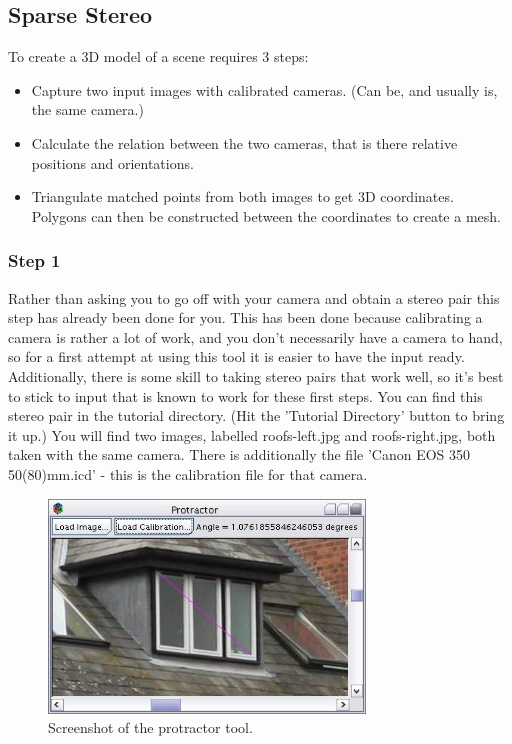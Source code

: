 \documentclass[10pt,a4paper,twoside]{article}
\begin{document}
\subsection {Sparse Stereo}
To create a 3D model of a scene requires 3 steps:
\begin{itemize}
\item Capture two input images with calibrated cameras. (Can be, and usually is, the same camera.)
\item Calculate the relation between the two cameras, that is there relative positions and orientations.
\item Triangulate matched points from both images to get 3D coordinates. Polygons can then be constructed between the coordinates to create a mesh.
\end{itemize}


\subsubsection {Step 1}

Rather than asking you to go off with your camera and obtain a stereo pair this step has already been done for you. This has been done because calibrating a camera is rather a lot of work, and you don't necessarily have a camera to hand, so for a first attempt at using this tool it is easier to have the input ready. Additionally, there is some skill to taking stereo pairs that work well, so it's best to stick to input that is known to work for these first steps. You can find this stereo pair in the tutorial directory. (Hit the 'Tutorial Directory' button to bring it up.) You will find two images, labelled roofs-left.jpg and roofs-right.jpg, both taken with the same camera. There is additionally the file 'Canon EOS 350 50(80)mm.icd' - this is the calibration file for that camera. 

\begin{figure}
 \centering
 \includegraphics[width=0.75\textwidth]{screenshots/protractor}
 \caption{Screenshot of the protractor tool.}
 \label{fig:protractor}
\end{figure}
\end{document}
